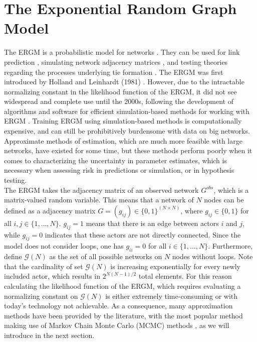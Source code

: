 \documentclass{llncs}
\begin{document}
\section{The Exponential Random Graph Model}
The ERGM is a probabilistic model for networks \cite{chatterjee2013estimating,Wasserman.1996,robins.pattison.2007}. They can be used for link prediction \cite{lu2010supervised}, simulating network adjacency matrices \cite{hackney2006agent}, and testing theories regarding the processes underlying tie formation \cite{goodreau2009birds}. The ERGM was first introduced by Holland and Leinhardt (1981) \cite{holland1981exponential}. However, due to the intractable normalizing constant in the likelihood function of the ERGM, it did not see widespread and complete use until the 2000s, following the development of algorithms and software for efficient simulation-based methods for working with ERGM \cite{snijders2002markov}. Training ERGM using simulation-based methods is computationally expensive, and can still be prohibitively burdensome with data on big networks. Approximate methods of estimation, which are much more feasible with large networks, have existed for some time, but these methods perform poorly when it comes to characterizing the uncertainty in parameter estimates, which is necessary when assessing risk in predictions or simulation, or in hypothesis testing.\\
\indent The ERGM takes the adjacency matrix of an observed network $G^{obs}$, which is a matrix-valued random variable. This means that a network of $N$ nodes can be defined as a adjacency matrix $G=(g_{ij})\in \{0,1\}^{(N \times N)}$, where $g_{ij} \in \{0,1\}$ for all $i,j \in \{1,\dots , N\}$. $g_{ij}=1$ means that there is an edge between actors $i$ and $j$, while $g_{ij}=0$ indicates that these actors are not directly connected. Since the model does not consider loops, one has $g_{ii}=0$ for all $i \in \{1,\dots , N\}$. Furthermore, define $\mathcal{G}(N)$
as the set of all possible networks on $N$ nodes without loops. Note that the cardinality of set $\mathcal{G}(N)$ is increasing exponentially for every newly included actor, which results in $2^{N(N-1)/2}$ total elements. %
For this reason calculating the likelihood function of the ERGM, which requires evaluating a normalizing constant on $\mathcal{G}(N)$  is either extremely time-consuming or with today's technology not achievable. As a consequence, many approximation methods have been provided by the literature, with the most popular method making use of Markov Chain Monte Carlo (MCMC) methods \cite{hunter2012computational}, as we will introduce in the next section.\\  
\end{document}
